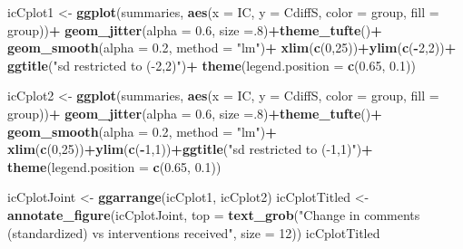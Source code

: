 \documentclass[10pt,dvipsnames,enabledeprecatedfontcommands]{scrartcl}
\newenvironment{Shaded}{\begin{snugshade}}{\end{snugshade}}
\newcommand{\KeywordTok}[1]{\textcolor[rgb]{0.13,0.29,0.53}{\textbf{#1}}}
\newcommand{\DataTypeTok}[1]{\textcolor[rgb]{0.13,0.29,0.53}{#1}}
\newcommand{\DecValTok}[1]{\textcolor[rgb]{0.00,0.00,0.81}{#1}}
\newcommand{\FloatTok}[1]{\textcolor[rgb]{0.00,0.00,0.81}{#1}}
\newcommand{\StringTok}[1]{\textcolor[rgb]{0.31,0.60,0.02}{#1}}
\newcommand{\OperatorTok}[1]{\textcolor[rgb]{0.81,0.36,0.00}{\textbf{#1}}}
\newcommand{\NormalTok}[1]{#1}
\begin{document}
\begin{Shaded}
\begin{Highlighting}[]
\NormalTok{icCplot1 <-}\StringTok{ }\KeywordTok{ggplot}\NormalTok{(summaries, }\KeywordTok{aes}\NormalTok{(}\DataTypeTok{x =}\NormalTok{ IC, }\DataTypeTok{y =}\NormalTok{ CdiffS, }\DataTypeTok{color =}\NormalTok{ group, }\DataTypeTok{fill =}\NormalTok{ group))}\OperatorTok{+}
\StringTok{  }\KeywordTok{geom_jitter}\NormalTok{(}\DataTypeTok{alpha =} \FloatTok{0.6}\NormalTok{, }\DataTypeTok{size =}\NormalTok{.}\DecValTok{8}\NormalTok{)}\OperatorTok{+}\KeywordTok{theme_tufte}\NormalTok{()}\OperatorTok{+}
\StringTok{  }\KeywordTok{geom_smooth}\NormalTok{(}\DataTypeTok{alpha =} \FloatTok{0.2}\NormalTok{, }\DataTypeTok{method =} \StringTok{"lm"}\NormalTok{)}\OperatorTok{+}
\StringTok{  }\KeywordTok{xlim}\NormalTok{(}\KeywordTok{c}\NormalTok{(}\DecValTok{0}\NormalTok{,}\DecValTok{25}\NormalTok{))}\OperatorTok{+}\KeywordTok{ylim}\NormalTok{(}\KeywordTok{c}\NormalTok{(}\OperatorTok{-}\DecValTok{2}\NormalTok{,}\DecValTok{2}\NormalTok{))}\OperatorTok{+}
\StringTok{  }\KeywordTok{ggtitle}\NormalTok{(}\StringTok{"sd restricted to (-2,2)"}\NormalTok{)}\OperatorTok{+}
\StringTok{  }\KeywordTok{theme}\NormalTok{(}\DataTypeTok{legend.position =} \KeywordTok{c}\NormalTok{(}\FloatTok{0.65}\NormalTok{, }\FloatTok{0.1}\NormalTok{))}

\NormalTok{icCplot2 <-}\StringTok{  }\KeywordTok{ggplot}\NormalTok{(summaries, }\KeywordTok{aes}\NormalTok{(}\DataTypeTok{x =}\NormalTok{ IC, }\DataTypeTok{y =}\NormalTok{ CdiffS, }\DataTypeTok{color =}\NormalTok{ group, }\DataTypeTok{fill =}\NormalTok{ group))}\OperatorTok{+}
\StringTok{  }\KeywordTok{geom_jitter}\NormalTok{(}\DataTypeTok{alpha =} \FloatTok{0.6}\NormalTok{, }\DataTypeTok{size =}\NormalTok{.}\DecValTok{8}\NormalTok{)}\OperatorTok{+}\KeywordTok{theme_tufte}\NormalTok{()}\OperatorTok{+}
\StringTok{  }\KeywordTok{geom_smooth}\NormalTok{(}\DataTypeTok{alpha =} \FloatTok{0.2}\NormalTok{, }\DataTypeTok{method =} \StringTok{"lm"}\NormalTok{)}\OperatorTok{+}
\StringTok{  }\KeywordTok{xlim}\NormalTok{(}\KeywordTok{c}\NormalTok{(}\DecValTok{0}\NormalTok{,}\DecValTok{25}\NormalTok{))}\OperatorTok{+}\KeywordTok{ylim}\NormalTok{(}\KeywordTok{c}\NormalTok{(}\OperatorTok{-}\DecValTok{1}\NormalTok{,}\DecValTok{1}\NormalTok{))}\OperatorTok{+}\KeywordTok{ggtitle}\NormalTok{(}\StringTok{"sd restricted to (-1,1)"}\NormalTok{)}\OperatorTok{+}
\StringTok{  }\KeywordTok{theme}\NormalTok{(}\DataTypeTok{legend.position =} \KeywordTok{c}\NormalTok{(}\FloatTok{0.65}\NormalTok{, }\FloatTok{0.1}\NormalTok{))}

\NormalTok{icCplotJoint <-}\StringTok{ }\KeywordTok{ggarrange}\NormalTok{(icCplot1, icCplot2) }
\NormalTok{icCplotTitled <-}\StringTok{ }\KeywordTok{annotate_figure}\NormalTok{(icCplotJoint, }
  \DataTypeTok{top =} \KeywordTok{text_grob}\NormalTok{(}\StringTok{"Change in comments (standardized) vs interventions received"}\NormalTok{,}
   \DataTypeTok{size =} \DecValTok{12}\NormalTok{))}
\NormalTok{icCplotTitled}
\end{Highlighting}
\end{Shaded}
\end{document}
